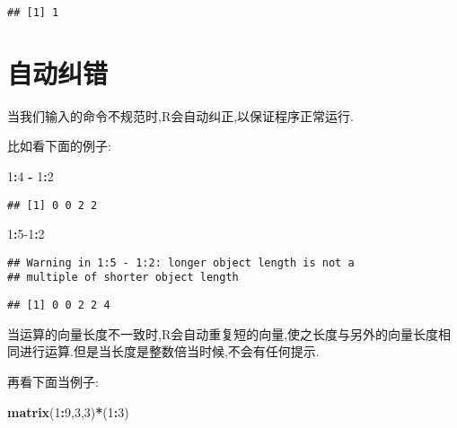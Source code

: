 \documentclass[]{ctexbook}
\newenvironment{Shaded}{\begin{snugshade}}{\end{snugshade}}
\newcommand{\DecValTok}[1]{\textcolor[rgb]{0.00,0.00,0.81}{#1}}
\newcommand{\KeywordTok}[1]{\textcolor[rgb]{0.13,0.29,0.53}{\textbf{#1}}}
\newcommand{\NormalTok}[1]{#1}
\newcommand{\OperatorTok}[1]{\textcolor[rgb]{0.81,0.36,0.00}{\textbf{#1}}}
\newcommand{\StringTok}[1]{\textcolor[rgb]{0.31,0.60,0.02}{#1}}
\begin{document}
\begin{verbatim}
## [1] 1
\end{verbatim}

\hypertarget{section-5}{%
\section{自动纠错}\label{section-5}}

当我们输入的命令不规范时,R会自动纠正,以保证程序正常运行.

比如看下面的例子:

\begin{Shaded}
\begin{Highlighting}[]
\DecValTok{1}\OperatorTok{:}\DecValTok{4} \OperatorTok{-}\StringTok{ }\DecValTok{1}\OperatorTok{:}\DecValTok{2}
\end{Highlighting}
\end{Shaded}

\begin{verbatim}
## [1] 0 0 2 2
\end{verbatim}

\begin{Shaded}
\begin{Highlighting}[]
\DecValTok{1}\OperatorTok{:}\DecValTok{5-1}\OperatorTok{:}\DecValTok{2}
\end{Highlighting}
\end{Shaded}

\begin{verbatim}
## Warning in 1:5 - 1:2: longer object length is not a
## multiple of shorter object length
\end{verbatim}

\begin{verbatim}
## [1] 0 0 2 2 4
\end{verbatim}

当运算的向量长度不一致时,R会自动重复短的向量,使之长度与另外的向量长度相同进行运算.但是当长度是整数倍当时候,不会有任何提示.

再看下面当例子:

\begin{Shaded}
\begin{Highlighting}[]
\KeywordTok{matrix}\NormalTok{(}\DecValTok{1}\OperatorTok{:}\DecValTok{9}\NormalTok{,}\DecValTok{3}\NormalTok{,}\DecValTok{3}\NormalTok{)}\OperatorTok{*}\NormalTok{(}\DecValTok{1}\OperatorTok{:}\DecValTok{3}\NormalTok{)}
\end{Highlighting}
\end{Shaded}
\end{document}
